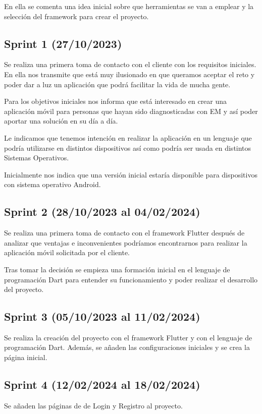 En ella se comenta una idea inicial sobre que herramientas se van a emplear y la selección del framework para crear el proyecto.

\subsection{Sprint 1 (27/10/2023)}
Se realiza una primera toma de contacto con el cliente con los requisitos iniciales. En ella nos transmite que está muy ilusionado en 
que queramos aceptar el reto y poder dar a luz un aplicación que podrá facilitar la vida de mucha gente.

Para los objetivos iniciales nos informa que está interesado en crear una aplicación móvil para personas que hayan sido diagnosticadas
con EM y así poder aportar una solución en su día a día.

Le indicamos que tenemos intención en realizar la aplicación en un lenguaje que podría utilizarse en distintos dispositivos así como podría 
ser usada en distintos Sistemas Operativos. 

Inicialmente nos indica que una versión inicial estaría disponible para dispositivos con sistema operativo Android.

\subsection{Sprint 2 (28/10/2023 al 04/02/2024)}
Se realiza una primera toma de contacto con el framework Flutter después de analizar que ventajas e inconvenientes podríamos encontrarnos
para realizar la aplicación móvil solicitada por el cliente.

Tras tomar la decisión se empieza una formación inicial en el lenguaje de programación Dart para entender su funcionamiento y poder realizar
el desarrollo del proyecto.

\subsection{Sprint 3 (05/10/2023 al 11/02/2024)}
Se realiza la creación del proyecto con el framework Flutter y con el lenguaje de programación Dart. Además, se añaden las configuraciones iniciales
y se crea la página inicial.

\subsection{Sprint 4 (12/02/2024 al 18/02/2024)}
Se añaden las páginas de de Login y Registro al proyecto.

